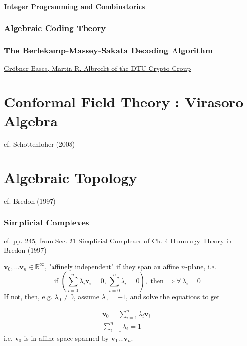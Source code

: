\documentclass[10pt]{amsart}
\begin{document}
\begin{multicols*}{2}
\subsection{Integer Programming and Combinatorics}



\section{Algebraic Coding Theory}


\section{The Berlekamp-Massey-Sakata Decoding Algorithm}





\href{https://martinralbrecht.files.wordpress.com/2010/07/20131022_buchberger_dtu.pdf}{Gr\"{o}bner Bases, Martin R. Albrecht of the DTU Crypto Group}

\part{Conformal Field Theory : Virasoro Algebra}  

cf.  Schottenloher (2008)  \cite{Scho2008}


\part{Algebraic Topology}  

cf. Bredon (1997) \cite{Bred1997}


\section{Simplicial Complexes}  

cf. pp. 245, from Sec. 21 Simplicial Complexes of Ch. 4 Homology Theory in Bredon (1997) \cite{Bred1997}

$\mathbf{v}_0, \dots \mathbf{v}_n \in \mathbb{R}^{\infty}$, "affinely independent" if they span an affine $n$-plane, i.e. 
\[
\text{ if } \left( \sum_{i=0}^n \lambda_i \mathbf{v}_i =0 , \, \sum_{i=0}^n \lambda_i = 0 \right), \text{ then } \Longrightarrow \forall \, \lambda_i = 0
\]
If not, then, e.g. $\lambda_0 \neq 0$, assume $\lambda_0 =-1$, and solve the equations to get 

\[
\begin{gathered}
\mathbf{v}_0 = \sum_{i=1}^n \lambda_i \mathbf{v}_i \\
\sum_{i=1}^n \lambda_i = 1
\end{gathered}
\]
i.e. $\mathbf{v}_0$ is in affine space spanned by $\mathbf{v}_1\dots \mathbf{v}_n$.  


\end{multicols*}
\end{document}
